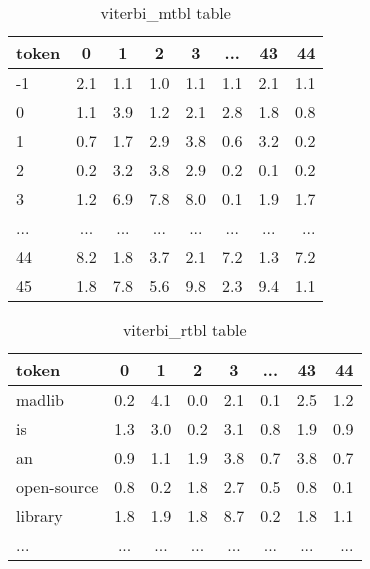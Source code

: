 \begin{itemize}
\begin {table}[h]
\caption {viterbi\_mtbl table} \label{tab:viterbimtbl} 
 \begin{center}
  \begin{tabular}{l*{6}{c}r}
   token             & 0   & 1   & 2   & 3   & ... & 43 &  44 \\
   \hline
  -1                 & 2.1 & 1.1 & 1.0 & 1.1 & 1.1 & 2.1 & 1.1  \\
   0                 & 1.1 & 3.9 & 1.2 & 2.1 & 2.8 & 1.8 & 0.8  \\
   1                 & 0.7 & 1.7 & 2.9 & 3.8 & 0.6 & 3.2 & 0.2  \\
   2                 & 0.2 & 3.2 & 3.8 & 2.9 & 0.2 & 0.1 & 0.2  \\
   3                 & 1.2 & 6.9 & 7.8 & 8.0 & 0.1 & 1.9 & 1.7  \\
   ...               & ... & ... & ... & ... & ... & ... & ...  \\
   44                & 8.2 & 1.8 & 3.7 & 2.1 & 7.2 & 1.3 & 7.2  \\
   45                & 1.8 & 7.8 & 5.6 & 9.8 & 2.3 & 9.4 & 1.1  
  \end{tabular}
 \end{center}
\end{table}
\begin {table}[h]
\caption {viterbi\_rtbl table} \label{tab:viterbirtbl} 
 \begin{center}
  \begin{tabular}{l*{6}{c}r}
   token             & 0   & 1   & 2   & 3   & ... & 43 &  44 \\
   \hline
   madlib            & 0.2 & 4.1 & 0.0 & 2.1 & 0.1 & 2.5 & 1.2  \\
   is                & 1.3 & 3.0 & 0.2 & 3.1 & 0.8 & 1.9 & 0.9  \\
   an                & 0.9 & 1.1 & 1.9 & 3.8 & 0.7 & 3.8 & 0.7  \\
   open-source       & 0.8 & 0.2 & 1.8 & 2.7 & 0.5 & 0.8 & 0.1  \\
   library           & 1.8 & 1.9 & 1.8 & 8.7 & 0.2 & 1.8 & 1.1  \\
   ...               & ... & ... & ... & ... & ... & ... & ...  \\
  \end{tabular}
 \end{center}
\end{table}
\end{itemize}

